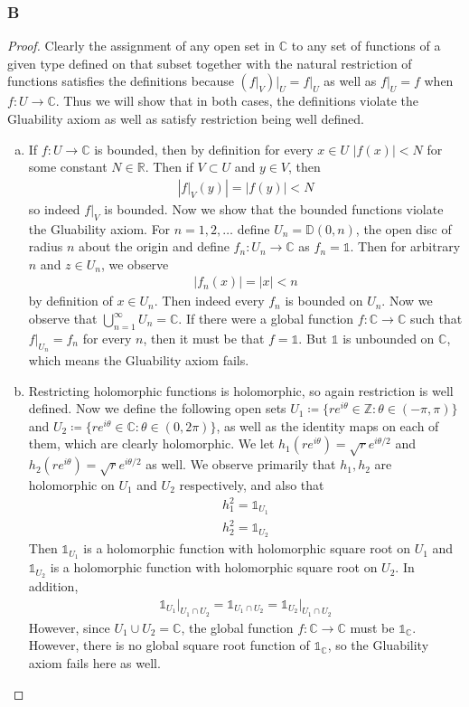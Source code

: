 \documentclass{article}
\newcommand{\R}{\mathbb{R}}
\newcommand{\Z}{\mathbb{Z}}
\newcommand{\C}{\mathbb{C}}
\newcommand{\altid}{\mathds{1}}
\newcommand{\D}{\mathbb{D}}
\begin{document}
\subsubsection{B}\label{2.2.B}
\begin{proof}
Clearly the assignment of any open set in $\C$ to any set of functions of a given type defined on that subset together with the natural restriction of functions satisfies the definitions because $(f\vert_V)\vert_U=f\vert_U$ as well as $f\vert_U=f$ when $f:U\to \C$. Thus we will show that in both cases, the definitions violate the Gluability axiom as well as satisfy restriction being well defined.
    \begin{enumerate}[(a)]
        \item If $f:U\to \C$ is bounded, then by definition for every $x\in U$ $|f(x)|<N$ for some constant $N\in \R$. Then if $V\subset U$ and $y\in V$, then
        \begin{align*}
            |f\vert_V(y)|=|f(y)|<N
        \end{align*}
        so indeed $f\vert_V$ is bounded. Now we show that the bounded functions violate the Gluability axiom. For $n=1,2,\dots$ define $U_n=\D(0,n)$, the open disc of radius $n$ about the origin and define $f_n:U_n\to \C$ as $f_n=\altid$. Then for arbitrary $n$ and $z\in U_n$, we observe
        \begin{align*}
            |f_n(x)|=|x|<n
        \end{align*}
        by definition of $x\in U_n$. Then indeed every $f_n$ is bounded on $U_n$. Now we observe that $\bigcup_{n=1}^\infty U_n=\C$. If there were a global function $f:\C\to \C$ such that $f\vert_{U_n}=f_n$ for every $n$, then it must be that $f=\altid$. But $\altid$ is unbounded on $\C$, which means the Gluability axiom fails.
        \item Restricting holomorphic functions is holomorphic, so again restriction is well defined. Now we define the following open sets $U_1\coloneqq \{re^{i\theta}\in \Z:\theta \in (-\pi,\pi)\}$ and $U_2\coloneqq \{re^{i\theta}\in \C:\theta \in (0,2\pi)\}$, as well as the identity maps on each of them, which are clearly holomorphic. We let $h_1(re^{i\theta})=\sqrt{r}e^{i\theta/2}$ and $h_2(re^{i\theta})=\sqrt{r}e^{i\theta/2}$ as well. We observe primarily that $h_1,h_2$ are holomorphic on $U_1$ and $U_2$ respectively, and also that
        \begin{align*}
            h_1^2=\altid_{U_1}\\
            h_2^2=\altid_{U_2}
        \end{align*}
        Then $\altid_{U_1}$ is a holomorphic function with holomorphic square root on $U_1$ and $\altid_{U_2}$ is a holomorphic function with holomorphic square root on $U_2$. In addition, 
        \begin{align*}
            \altid_{U_1}\vert_{U_1\cap U_2}=\altid_{U_1\cap U_2}=\altid_{U_2}\vert_{U_1\cap U_2}
        \end{align*} However, since $U_1\cup U_2=\C$, the global function $f:\C\to \C$ must be $\altid_{\C}$. However, there is no global square root function of $\altid_{\C}$, so the Gluability axiom fails here as well.
    \end{enumerate}
\end{proof}
\end{document}
